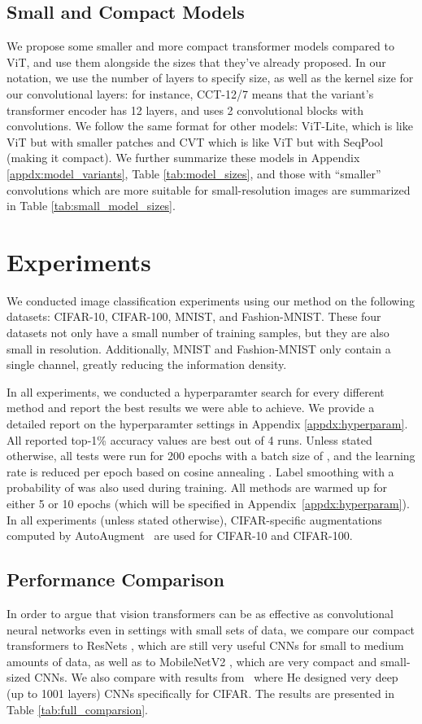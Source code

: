 \documentclass[10pt,twocolumn,letterpaper]{article}
\begin{document}
\subsection{Small and Compact Models}
We propose some smaller and more compact transformer models compared to ViT, and use them alongside the sizes that they've already proposed. 
In our notation, we use the number of layers to specify size, as well as the kernel size for our convolutional layers: for instance, CCT-12/7 means that the variant's transformer encoder has 12 layers, and uses 2 convolutional blocks with  convolutions.
We follow the same format for other models: ViT-Lite, which is like ViT but with smaller patches and CVT which is like ViT but with SeqPool (making it compact).
We further summarize these models in Appendix \ref{appdx:model_variants}, Table \ref{tab:model_sizes}, and those with ``smaller'' convolutions which are more suitable for small-resolution images are summarized in Table \ref{tab:small_model_sizes}.


\section{Experiments}
\label{sec:experiments}
We conducted image classification experiments using our method on the following datasets: CIFAR-10, CIFAR-100, MNIST, and Fashion-MNIST. These four datasets not only have a small number of training samples, but they are also small in resolution.
Additionally, MNIST and Fashion-MNIST only contain a single channel, greatly reducing the information density.

In all experiments, we conducted a hyperparamter search for every different method and report the best results we were able to achieve. We provide a detailed report on the hyperparamter settings in Appendix \ref{appdx:hyperparam}.
All reported top-1\% accuracy values are best out of 4 runs. Unless stated otherwise, all tests were run for 200 epochs with a batch size of , and the learning rate is reduced per epoch based on cosine annealing \cite{loshchilov2017sgdr}. Label smoothing with a probability of  was also used during training. All methods are warmed up for either 5 or 10 epochs (which will be specified in Appendix~\ref{appdx:hyperparam}). In all experiments (unless stated otherwise), CIFAR-specific augmentations computed by AutoAugment~\cite{cubuk2019autoaugment}
are used for CIFAR-10 and CIFAR-100.

\subsection{Performance Comparison}
In order to argue that vision transformers can be as effective as convolutional neural networks even in settings with small sets of data, we compare our compact transformers to ResNets \cite{he2016deep}, which are still very useful CNNs for small to medium amounts of data, as well as to MobileNetV2 \cite{sandler2018mobilenetv2}, which are very compact and small-sized CNNs. We also compare with results from~\cite{he2016identity} where He \etal designed very deep (up to 1001 layers) CNNs specifically for CIFAR. The results are presented in Table \ref{tab:full_comparsion}.
\end{document}
